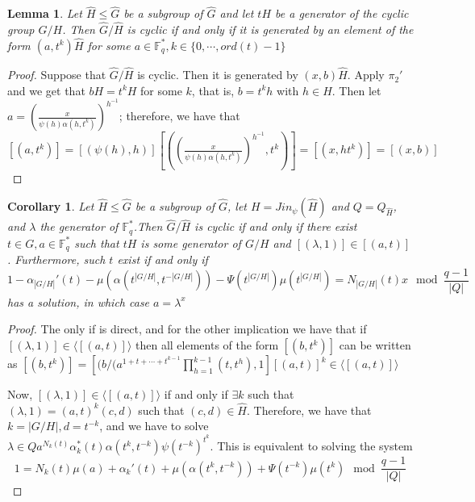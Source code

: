 \documentclass{article}
\newtheorem{lemma}[theorem]{Lemma}
\newtheorem{corollary}[theorem]{Corollary}
\begin{document}
\begin{lemma}
      Let $\hat{H}\leq \hat{G}$ be a subgroup of $\hat{G}$ and let $tH$ be a generator of the cyclic group $G/H$. Then $\hat{G}/\hat{H}$ is cyclic if and only if it is generated by an element of the form $(a,t^k) \hat{H}$ for some $a\in \mathbb{F}_q^*, k \in \{0,\cdots, ord(t)-1\}$
\end{lemma}
\begin{proof}
    Suppose that $\hat{G}/\hat{H}$ is cyclic. Then it is generated by $(x,b) \hat{H}$. Apply $\pi_2'$ and we get that $bH= t^kH$ for some $k$, that is, $b= t^kh$ with $h\in H$. Then let $a=(\frac{x}{\psi(h)\alpha(h,t^k)})^{h^{-1}}$; therefore, we have that $[(a,t^k)] = [(\psi(h),h)][((\frac{x}{\psi(h)\alpha(h,t^k)})^{h^{-1}},t^k)]  = [(x,ht^k)] = [(x,b)]$
\end{proof}

\begin{corollary}
        Let $\hat{H}\leq \hat{G}$ be a subgroup of $\hat{G}$, let $H=Jin_\psi(\hat{H})$ and $Q=Q_{\hat{H}}$, and $\lambda$ the generator of $\mathbb{F}_q^*$.Then $\hat{G}/ \hat{H}$ is cyclic if and only if there exist $t\in G, a \in \mathbb{F}_q^*$ such that $t H$ is some generator of $G/H$ and $[(\lambda,1)] \in [(a,t)]$. Furthermore, such $t$ exist if and only if 
            \begin{equation} \label{eqCyclic}
          1 - \alpha_{|G/H |}'(t) - \mu( \alpha(t^{|G/H |},t^{-|G/H |}))-\Psi(t^{|G/H |})\mu(t^{|G/H |})= N_{|G/H |}(t) x  \mod{ \frac{q-1}{|Q|}}
    \end{equation}
    has a solution, in which case $a=\lambda^x$
\end{corollary}
\begin{proof}
    The only if is direct, and for the other implication we have that if $[(\lambda,1)] \in \langle [(a,t)] \rangle$ then all elements of the form $[(b,t^k)]$ can be written as $[(b,t^k)] = [(b/(a^{1+t+\cdots + t^{k-1}} \prod_{h=1}^{k-1}(t,t^h),1 ] [(a,t)]^k \in \langle [(a,t)] \rangle$

    Now, $[(\lambda,1)] \in \langle [(a,t)] \rangle$ if and only if $\exists k$ such that $(\lambda,1) = (a,t)^k (c,d)$ such that $(c,d) \in \hat{H}$. Therefore, we have that $k=|G/H |, d=t^{-k}$, and we have to solve $\lambda \in Q a^{N_k(t)} \alpha_k^*(t)\alpha(t^k,t^{-k})\psi(t^{-k})^{t^k}$. This is equivalent to solving the system
    \begin{equation}
        1 = N_k(t) \mu(a) + \alpha_k'(t)+ \mu( \alpha(t^k,t^{-k}))+\Psi(t^{-k})\mu(t^k) \mod{ \frac{q-1}{|Q|}}
    \end{equation}
\end{proof}
\end{document}
